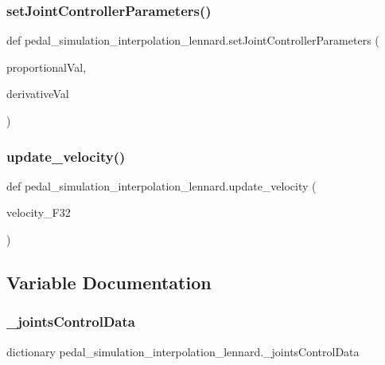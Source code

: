 \subsubsection{\texorpdfstring{setJointControllerParameters()}{setJointControllerParameters()}}
{\footnotesize\ttfamily def pedal\+\_\+simulation\+\_\+interpolation\+\_\+lennard.\+set\+Joint\+Controller\+Parameters (\begin{DoxyParamCaption}\item[{}]{proportional\+Val,  }\item[{}]{derivative\+Val }\end{DoxyParamCaption})}

\mbox{\label{namespacepedal__simulation__interpolation__lennard_a815caeaf6a6a52507b939cbaad0e676b}} 
\subsubsection{\texorpdfstring{update\_velocity()}{update\_velocity()}}
{\footnotesize\ttfamily def pedal\+\_\+simulation\+\_\+interpolation\+\_\+lennard.\+update\+\_\+velocity (\begin{DoxyParamCaption}\item[{}]{velocity\+\_\+\+F32 }\end{DoxyParamCaption})}



\subsection{Variable Documentation}
\mbox{\label{namespacepedal__simulation__interpolation__lennard_a3f49ea6545158a29067f23151f804d05}} 
\subsubsection{\texorpdfstring{\_jointsControlData}{\_jointsControlData}}
{\footnotesize\ttfamily dictionary pedal\+\_\+simulation\+\_\+interpolation\+\_\+lennard.\+\_\+joints\+Control\+Data\hspace{0.3cm}{\ttfamily [private]}}


